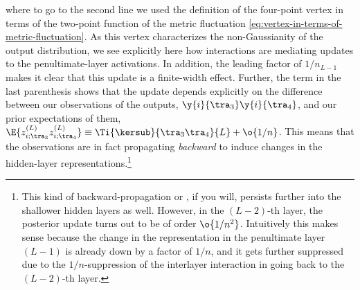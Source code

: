 where to go to the second line we used the definition of the four-point vertex in terms of the two-point function of the metric fluctuation \eqref{eq:vertex-in-terms-of-metric-fluctuation}. As this vertex characterizes the non-Gaussianity of the output distribution, we see explicitly here how interactions are mediating updates to the penultimate-layer activations. In addition, the leading factor of $1/n_{L-1}$ makes it clear that this update is a finite-width effect. Further,  the term in the last parenthesis shows that the update depends explicitly on the difference between our observations of the outputs, $\y{i}{\tra_3}\y{i}{\tra_4}$, and our prior expectations of them, $\E{z^{(L)}_{i;\tra_3} z^{(L)}_{i;\tra_4} } \equiv \Ti{\kersub}{\tra_3\tra_4}{L} + \o{1/n}$. This means that the observations are in fact propagating \emph{backward} to induce changes in the hidden-layer representations.\footnote{This kind of backward-propagation or , if you will, persists further into the shallower hidden layers as well.
However, in the $(L-2)$-th layer, the posterior update turns out to be of order $\o{1/n^2}$. Intuitively this makes sense because the change in the representation in the penultimate layer $(L-1)$ is already down by a factor of $1/n$, and it gets further suppressed due to the $1/n$-suppression of the interlayer interaction in going back to the $(L-2)$-th layer.

}
